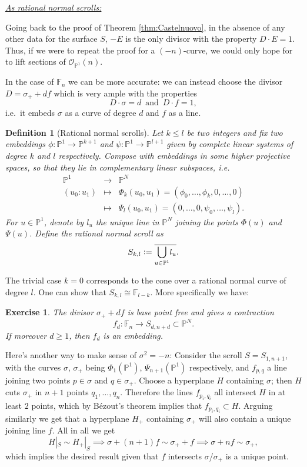 \documentclass[a4paper,11pt]{amsart}
\newtheorem{definition}[theorem]{Definition}
\newtheorem{exercise}[theorem]{Exercise}
\newcommand{\OO}{\mathcal{O}}
\newcommand{\PP}{\mathbb{P}}
\renewcommand{\FF}{\mathbb{F}}
\newcommand{\isom}{\cong}
\newcommand{\defeq}{\vcentcolon=}
\begin{document}
\vspace{.3cm}

\noindent\underline{\emph{As rational normal scrolls:}}

Going back to the proof of Theorem \ref{thm:Castelnuovo}, in the absence of any other data for the surface $S$, $-E$ is the only divisor with the property $D\cdot E = 1$.
Thus, if we were to repeat the proof for a $(-n)$-curve, we could only hope for to lift sections of $\OO_{\PP^1}(n)$.

In the case of $\FF_n$ we can be more accurate: we can instead choose the divisor $D = \sigma_+ +df$ which is very ample with the properties 
\[
D \cdot \sigma = d \, \text{ and } \, D\cdot f = 1,
\]
i.e.\ it embeds $\sigma$ as a curve of degree $d$ and $f$ as a line.

\begin{definition}[{Rational normal scrolls}]
	Let $k\leq l$ be two integers and fix two embeddings $\phi\colon \PP^1 \to \PP^{k+1}$ and $\psi\colon \PP^1 \to \PP^{l+1}$ given by complete linear systems of degree $k$ and $l$ respectively.
	Compose with embeddings in some higher projective spaces, so that they lie in complementary linear subspaces, i.e.\
	\[
	\begin{array}{ccc}
		\PP^1 & \to & \PP^N\\
		(u_0:u_1) & \mapsto & \Phi_k(u_0,u_1) = (\phi_0,\dots,\phi_k,0,\dots,0)\\
			\quad	&\mapsto &\Psi_l(u_0,u_1) = (0,\dots,0, \psi_0,\dots,\psi_l).
	\end{array}
	\]
	For $u \in \PP^1$, denote by $l_u$ the unique line in $\PP^N$ joining the points $\Phi(u)$ and $\Psi(u)$.
	Define the \emph{rational normal scroll} as
	\[
	S_{k,l} \defeq \overline{\underset{u\in \PP^1}{\bigcup}l_u}.
	\]
\end{definition}
	
The trivial case $k = 0$ corresponds to the cone over a rational normal curve of degree $l$.
One can show that $S_{k,l} \isom \FF_{l-k}$.
More specifically we have:
\begin{exercise}
	The divisor $\sigma_+ + df$ is base point free and gives a contraction
	\[
	f_d\colon \FF_n \to S_{d,n+d} \subset \PP^N.
	\] 
	If moreover $d\geq 1$, then $f_d$ is an embedding.
\end{exercise}

Here's another way to make sense of $\sigma^2 = -n$:
Consider the scroll $S = S_{1,n+1}$, with the curves $\sigma$, $\sigma_+$ being $\Phi_1(\PP^1)$, $\Psi_{n+1}(\PP^1)$ respectively, and $f_{p,q}$ a line joining two points $p\in \sigma$ and $q\in \sigma_+$.
Choose a hyperplane $H$ containing $\sigma$;
then $H$ cuts $\sigma_+$ in $n+1$ points $q_1,\dots,q_n$.
Therefore the lines $f_{p_i,q_i}$ all intersect $H$ in at least $2$ points, which by B{\'e}zout's theorem implies that $f_{p_i,q_i} \subset H$.
Arguing similarly we get that a hyperplane $H_+$ containing $\sigma_+$ will also contain a unique joining line $f$.
All in all we get
\[
H|_S \sim H_+|_S \implies \sigma + (n+1)f \sim \sigma_+ + f \implies \sigma + nf \sim \sigma_+,
\]
which implies the desired result given that $f$ intersects $\sigma$/$\sigma_+$ is a unique point.
	
\end{document}
